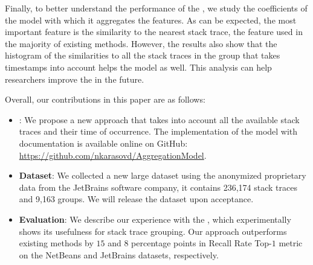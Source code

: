 Finally, to better understand the performance of the \ag, we study the coefficients of the model with which it aggregates the features.
As can be expected, the most important feature is the similarity to the nearest stack trace, the feature used in the majority of existing methods.
However, the results also show that the histogram of the similarities to all the stack traces in the group that takes timestamps into account helps the model as well.
This analysis can help researchers improve the \ag in the future.

Overall, our contributions in this paper are as follows:
\begin{itemize}
    \item \textbf{\ag}: We propose a new approach that takes into account all the available stack traces and their time of occurrence. 
    The implementation of the model with documentation is available online on GitHub: \url{https://github.com/nkarasovd/AggregationModel}. 
    \item \textbf{Dataset}: We collected a new large dataset using the anonymized proprietary data from the JetBrains software company, it contains 236,174 stack traces and 9,163 groups. 
    We will release the dataset upon acceptance.  
    \item \textbf{Evaluation}: We describe our experience with the \ag, which experimentally shows its usefulness for stack trace grouping. 
    Our approach outperforms existing methods by $15$ and $8$ percentage points in Recall Rate Top-$1$ metric on the NetBeans and JetBrains datasets, respectively.
\end{itemize}